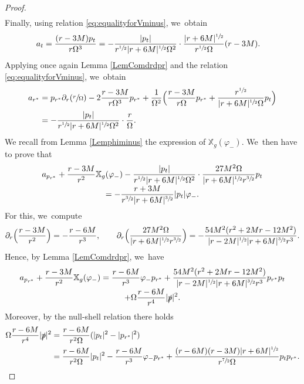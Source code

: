 \documentclass[JEP,XML,SOM,Unicode,published]{cedram}
\theoremstyle{plain}
\theoremstyle{definition}
\newcommand\T{{\mathbb{X}}}
\begin{document}
\begin{proof}
\begin{multline*}
\end{multline*}
Finally, using relation \eqref{eq:equalityforVminus}, we~obtain\vspace*{-3pt}
\begin{align*}
a_t & = \frac{(r-3M)p_t}{r \Omega^3}= - \frac{|p_t|}{r^{\sfrac{1}{2}}|r+6M|^{\sfrac{1}{2}}\Omega^2} \cdot \frac{|r+6M|^{\sfrac{1}{2}}}{r^{\sfrac{1}{2}}\Omega}(r-3M).
\end{align*}
Applying once again Lemma \ref{LemComdrdpr} and the relation \eqref{eq:equalityforVminus}, we~obtain\vspace*{-3pt}
\begin{align*}
a_{r^*} & =p_{r^*}\partial_{r}(\sfrac{r}{\Omega}) -2\frac{r-3M}{r \Omega^3}p_{r^*}+\frac{1}{\Omega^2}\Bigl(\frac{r-3M}{r\Omega}p_{r^*}+\frac{r^{\sfrac{1}{2}}}{|r+6M|^{\sfrac{1}{2}} \Omega}p_t \Bigr) \\
& = -\frac{|p_t|}{r^{\sfrac{1}{2}}|r+6M|^{\sfrac{1}{2}} \Omega^2}\cdot \frac{r}{\Omega}.
\end{align*}
We recall from Lemma \ref{Lemphiminus} the expression of $\T_g(\varphi_-)$. We~then have to prove that\vspace*{-5pt}
\begin{multline*}
a_{p_{r^*}} +\frac{r-3M}{r^2} \T_g (\varphi_-) - \frac{|p_t|}{r^{\sfrac{1}{2}}|r+6M|^{\sfrac{1}{2}}\Omega^2}\cdot \frac{27M^2 \Omega}{|r+6M|^{\sfrac{1}{2}}r^{\sfrac{3}{2}}}p_t\\[-3pt]
=- \frac{r+3M}{r^{\sfrac{3}{2}}|r+6M|^{\sfrac{3}{2}}}|p_t|\varphi_-.
\end{multline*}
For this, we~compute
\[
\partial_{r} \Bigl(\frac{r-3M}{r^2} \Bigr) = -\frac{r-6M}{r^3}, \qquad\partial_r \Bigl(\frac{27M^2 \Omega}{|r+6M|^{\sfrac{1}{2}}r^{\sfrac{3}{2}}} \Bigr)= -\frac{54M^2(r^2+2Mr-12M^2)}{|r-2M|^{\sfrac{1}{2}} |r+6M|^{\sfrac{3}{2}} r^3}.
\]
Hence, by Lemma \ref{LemComdrdpr}, we~have\vspace*{-5pt}
\begin{multline*} a_{p_{r^*}} +\frac{r-3M}{r^2} \T_g (\varphi_-) = \frac{r-6M}{r^3}\varphi_- p_{r^*}+ \frac{54M^2(r^2+2Mr-12M^2)}{|r-2M|^{\sfrac{1}{2}} |r+6M|^{\sfrac{3}{2}} r^3}p_{r^*} p_t \\[-3pt]
+\Omega \frac{r-6M}{r^4} |\slashed{p}|^2.
\end{multline*}
Moreover, by the null-shell relation there holds
\begin{align*}
\Omega \frac{r-6M}{r^4} |\slashed{p}|^2 & = \frac{r-6M}{r^2 \Omega} (|p_t|^2-|p_{r^*}|^2) \\
& =\frac{r-6M}{r^2 \Omega} |p_t|^2-\frac{r-6M}{r^3 } \varphi_- p_{r^*}+\frac{(r-6M)(r-3M)|r+6M|^{\sfrac{1}{2}}}{r^{\sfrac{7}{2}} \Omega } p_t p_{r^*}.

\end{align*}
\end{proof}
\end{document}
